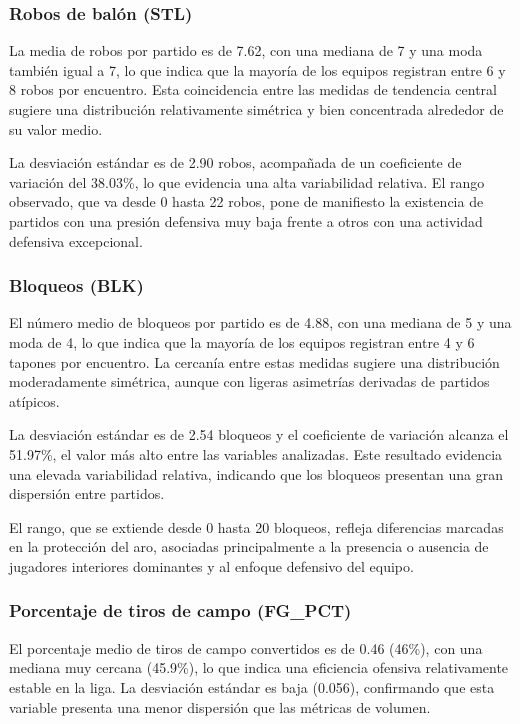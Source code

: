 \documentclass[12pt]{article}
\begin{document}
\subsubsection*{Robos de balón (STL)}

La media de robos por partido es de 7.62, con una mediana de 7 y una moda también igual a 7,
lo que indica que la mayoría de los equipos registran entre 6 y 8 robos por encuentro. Esta
coincidencia entre las medidas de tendencia central sugiere una distribución relativamente
simétrica y bien concentrada alrededor de su valor medio.

La desviación estándar es de 2.90 robos, acompañada de un coeficiente de variación del 38.03\%,
lo que evidencia una alta variabilidad relativa. El rango observado, que va desde 0 hasta 22 robos,
pone de manifiesto la existencia de partidos con una presión defensiva muy baja frente a otros
con una actividad defensiva excepcional.

\subsubsection*{Bloqueos (BLK)}

El número medio de bloqueos por partido es de 4.88, con una mediana de 5 y una moda de 4,
lo que indica que la mayoría de los equipos registran entre 4 y 6 tapones por encuentro. La
cercanía entre estas medidas sugiere una distribución moderadamente simétrica, aunque con
ligeras asimetrías derivadas de partidos atípicos.

La desviación estándar es de 2.54 bloqueos y el coeficiente de variación alcanza el 51.97\%,
el valor más alto entre las variables analizadas. Este resultado evidencia una elevada
variabilidad relativa, indicando que los bloqueos presentan una gran dispersión entre partidos.

El rango, que se extiende desde 0 hasta 20 bloqueos, refleja diferencias marcadas en la protección
del aro, asociadas principalmente a la presencia o ausencia de jugadores interiores dominantes
y al enfoque defensivo del equipo.


\subsubsection*{Porcentaje de tiros de campo (FG\_PCT)}

El porcentaje medio de tiros de campo convertidos es de 0.46 (46\%), con una mediana muy cercana
(45.9\%), lo que indica una eficiencia ofensiva relativamente estable en la liga. La desviación
estándar es baja (0.056), confirmando que esta variable presenta una menor dispersión que las
métricas de volumen.
\end{document}
